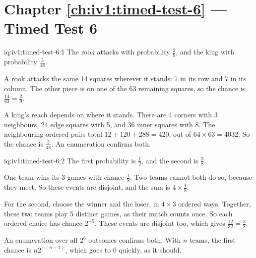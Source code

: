 \section*{Chapter \ref{ch:iv1:timed-test-6} --- Timed Test 6}

\begin{solution}{iq:iv1:timed-test-6:1}
The rook attacks with probability $\frac29$, and the king with probability $\frac{5}{48}$.

A rook attacks the same 14 squares wherever it stands: 7 in its row and 7 in its column. The other piece is on one of the 63 remaining squares, so the chance is $\frac{14}{63} = \frac29$.

A king's reach depends on where it stands. There are 4 corners with 3 neighbours, 24 edge squares with 5, and 36 inner squares with 8. The neighbouring ordered pairs total $12 + 120 + 288 = 420$, out of $64 \times 63 = 4032$. So the chance is $\frac{5}{48}$. An enumeration confirms both.

\end{solution}

\begin{solution}{iq:iv1:timed-test-6:2}
The first probability is $\frac12$, and the second is $\frac38$.

One team wins its 3 games with chance $\frac18$. Two teams cannot both do so, because they meet. So these events are disjoint, and the sum is $4 \times \frac18$.

For the second, choose the winner and the loser, in $4 \times 3$ ordered ways. Together, these two teams play 5 distinct games, as their match counts once. So each ordered choice has chance $2^{-5}$. These events are disjoint too, which gives $\frac{12}{32} = \frac38$.

An enumeration over all $2^6$ outcomes confirms both. With $n$ teams, the first chance is $n2^{-(n - 1)}$, which goes to 0 quickly, as it should.

\end{solution}

